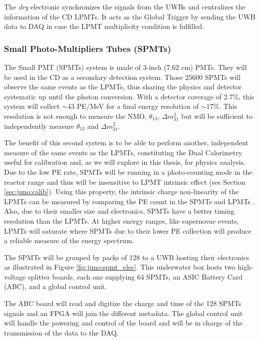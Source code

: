 \documentclass[../main.tex]{subfiles}
\begin{document}
The \textit{dry} electronic synchronizes the signals from the UWBs and centralizes the information of the CD LPMTs. It acts as the Global Trigger by sending the UWB data to DAQ in case the LPMT multiplicity condition is fulfilled.


\subsubsection{Small Photo-Multipliers Tubes (SPMTs)}
\label{sec:juno:SPMT}

The Small PMT (SPMTs) system is made of 3-inch (7.62 cm) PMTs. They will be used in the CD as a secondary detection system. Those 25600 SPMTs will observe the same events as the LPMTs, thus sharing the physics and detector systematic up until the photon conversion. With a detector coverage of 2.7\%, this system will collect $\sim 43$ PE/MeV for a final energy resolution of $\sim 17\%$. This resolution is not enough to measure the NMO, $\theta_{13}$, $\Delta m^2_{31}$ but will be sufficient to independently measure $\theta_{12}$ and $\Delta m^2_{21}$.

The benefit of this second system is to be able to perform another, independent measure of the same events as the LPMTs, constituting the Dual Calorimetry useful for calibration and, as we will explore in this thesis, for physics analysis.
Due to the low PE rate, SPMTs will be running in a photo-counting mode in the reactor range and thus will be insensitive to LPMT intrinsic effect (see Section \ref{sec:juno:calib}). Using this property, the intrinsic charge non-linearity of the LPMTs can be measured by comparing the PE count in the SPMTs and LPMTs \cite{han_dual_2021}. Also, due to their smaller size and electronics, SPMTs have a better timing resolution than the LPMTs.
At higher energy ranges, like supernovae events, LPMTs will saturate where SPMTs due to their lower PE collection will produce a reliable measure of the energy spectrum.

The SPMTs will be grouped by packs of 128 to a UWB hosting their electronics as illustrated in Figure \ref{fig:juno:spmt_elec}. This underwater box hosts two high-voltage splitter boards, each one supplying 64 SPMTs, an ASIC Battery Card (ABC), and a global control unit.

The ABC board will read and digitize the charge and time of the 128 SPMTs signals and an FPGA will join the different metadata. The global control unit will handle the powering and control of the board and will be in charge of the transmission of the data to the DAQ.
\end{document}
